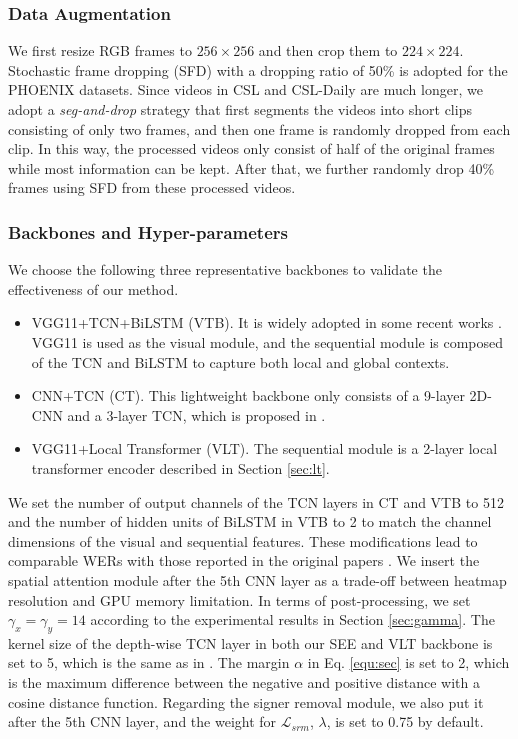 \documentclass[acmsmall,screen]{acmart}
\begin{document}
\subsubsection{Data Augmentation}
We first resize RGB frames to $256\times 256$ and then crop them to $224\times 224$.
Stochastic frame dropping (SFD) \cite{sfl} with a dropping ratio of 50\% is adopted for the PHOENIX datasets.
Since videos in CSL and CSL-Daily are much longer, we adopt a \textit{seg-and-drop} strategy that first segments the videos into short clips consisting of only two frames, and then one frame is randomly dropped from each clip.
In this way, the processed videos only consist of half of the original frames while most information can be kept.
After that, we further randomly drop 40\% frames using SFD from these processed videos.

\subsubsection{Backbones and Hyper-parameters}
We choose the following three representative backbones to validate the effectiveness of our method.
\begin{itemize}
    \item VGG11+TCN+BiLSTM (VTB). It is widely adopted in some recent works \cite{stmc, vac}. VGG11 \cite{vggnet} is used as the visual module, and the sequential module is composed of the TCN and BiLSTM to capture both local and global contexts.
    
    \item CNN+TCN (CT). This lightweight backbone only consists of a 9-layer 2D-CNN and a 3-layer TCN, which is proposed in \cite{fcn}.
    
    \item VGG11+Local Transformer (VLT). The sequential module is a 2-layer local transformer encoder described in Section \ref{sec:lt}. 
\end{itemize}
We set the number of output channels of the TCN layers in CT and VTB to 512 and the number of hidden units of BiLSTM in VTB to 2 to match the channel dimensions of the visual and sequential features. 
These modifications lead to comparable WERs with those reported in the original papers \cite{fcn, stmc}.
We insert the spatial attention module after the 5th CNN layer as a trade-off between heatmap resolution and GPU memory limitation.
In terms of post-processing, we set $\gamma_x=\gamma_y=14$ according to the experimental results in Section \ref{sec:gamma}.
The kernel size of the depth-wise TCN layer in both our SEE and VLT backbone is set to 5, which is the same as in \cite{qanet}.
The margin $\alpha$ in Eq. \ref{equ:sec} is set to 2, which is the maximum difference between the negative and positive distance with a cosine distance function.
Regarding the signer removal module, we also put it after the 5th CNN layer, and the weight for $\mathcal{L}_{srm}$, $\lambda$, is set to 0.75 by default.
\end{document}
